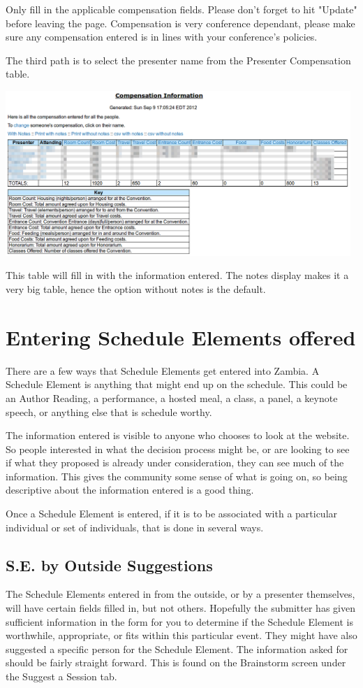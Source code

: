 \documentclass[captions=tablesignature]{scrartcl}
\begin{document}
Only fill in the applicable compensation fields.  Please don't
forget to hit "Update" before leaving the page.  Compensation is
very conference dependant, please make sure any compensation entered
is in lines with your conference's policies.

The third path is to select the presenter name from the Presenter
Compensation table.

\includegraphics[width=0.98\textwidth]{./Images/Compensation_Information.png}

This table will fill in with the information entered.  The notes
display makes it a very big table, hence the option without notes is
the default.
\section{Entering Schedule Elements offered}
\label{sec-5}

There are a few ways that Schedule Elements get entered into Zambia.
A Schedule Element is anything that might end up on the schedule.
This could be an Author Reading, a performance, a hosted meal, a
class, a panel, a keynote speech, or anything else that is schedule
worthy. 

The information entered is visible to anyone who chooses to look at
the website.  So people interested in what the decision process
might be, or are looking to see if what they proposed is already
under consideration, they can see much of the information.  This
gives the community some sense of what is going on, so being
descriptive about the information entered is a good thing.

Once a Schedule Element is entered, if it is to be associated with a
particular individual or set of individuals, that is done in several
ways.

\subsection{S.E. by Outside Suggestions}
\label{sec-5-1}
The Schedule Elements entered in from the outside, or by a
presenter themselves, will have certain fields filled in, but not
others.  Hopefully the submitter has given sufficient information
in the form for you to determine if the Schedule Element is
worthwhile, appropriate, or fits within this particular event.
They might have also suggested a specific person for the Schedule
Element.  The information asked for should be fairly
straight forward. This is found on the Brainstorm screen under the
Suggest a Session tab.
\end{document}
